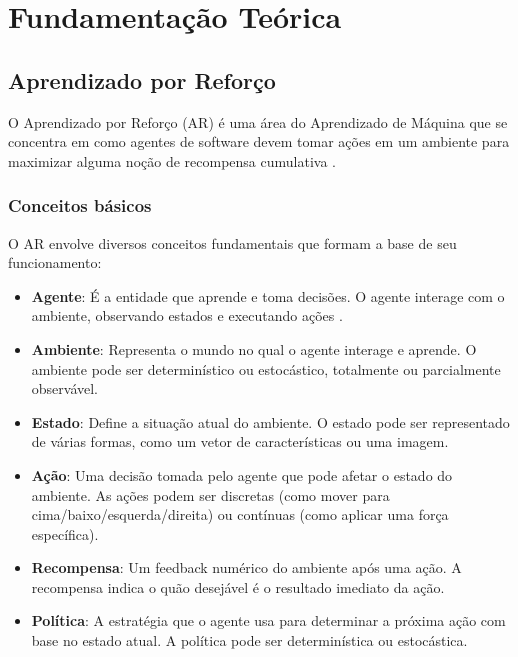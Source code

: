 \chapter{Fundamentação Teórica}
\label{cap:fund}

\section{Aprendizado por Reforço}
\label{sec:rl}

O Aprendizado por Reforço (AR) é uma área do Aprendizado de Máquina que se concentra em como agentes de software devem tomar ações em um ambiente para maximizar alguma noção de recompensa cumulativa \cite{sutton}. 

\subsection{Conceitos básicos}
\label{subsec:rl_conceitos}

O AR envolve diversos conceitos fundamentais que formam a base de seu funcionamento:

\begin{itemize}
    \item \textbf{Agente}: É a entidade que aprende e toma decisões. O agente interage com o ambiente, observando estados e executando ações \cite{sutton}.
    
    \item \textbf{Ambiente}: Representa o mundo no qual o agente interage e aprende. O ambiente pode ser determinístico ou estocástico, totalmente ou parcialmente observável.
    
    \item \textbf{Estado}: Define a situação atual do ambiente. O estado pode ser representado de várias formas, como um vetor de características ou uma imagem.
    
    \item \textbf{Ação}: Uma decisão tomada pelo agente que pode afetar o estado do ambiente. As ações podem ser discretas (como mover para cima/baixo/esquerda/direita) ou contínuas (como aplicar uma força específica).
    
    \item \textbf{Recompensa}: Um feedback numérico do ambiente após uma ação. A recompensa indica o quão desejável é o resultado imediato da ação.
    
    \item \textbf{Política}: A estratégia que o agente usa para determinar a próxima ação com base no estado atual. A política pode ser determinística ou estocástica.
\end{itemize}

